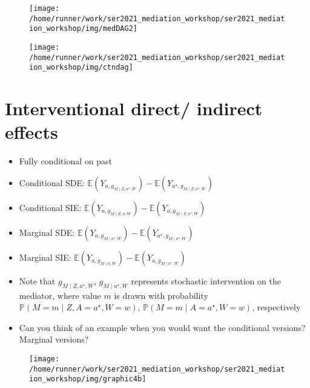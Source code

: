 \documentclass[
  12pt, krantz2,
]{book}
\providecommand{\tightlist}{%
  \setlength{\itemsep}{0pt}\setlength{\parskip}{0pt}}
\theoremstyle{definition}
\theoremstyle{definition}
\theoremstyle{definition}
\renewcommand{\P}{\mathbb{P}}
\newcommand{\E}{\mathbb{E}}
\newcommand{\1}{\mathbbm{1}}
\begin{document}
\begin{figure}

{\centering \texttt{[image: /home/runner/work/ser2021\_mediation\_workshop/ser2021\_mediation\_workshop/img/medDAG2]} 

}

\end{figure}

\begin{figure}

{\centering \texttt{[image: /home/runner/work/ser2021\_mediation\_workshop/ser2021\_mediation\_workshop/img/ctndag]} 

}

\end{figure}

\hypertarget{interventional-direct-indirect-effects}{%
\section*{Interventional direct/ indirect effects}\label{interventional-direct-indirect-effects}}


\begin{itemize}
\tightlist
\item
  Fully conditional on past
\item
  Conditional SDE: \(\E(Y_{a, g_{M \mid Z, a^{\star}, W}}) - \E(Y_{a^{\star}, g_{M \mid Z, a^{\star}, W}})\)
\item
  Conditional SIE: \(\E(Y_{a, g_{M \mid Z, a, W}}) - \E(Y_{a, g_{M \mid Z, a^{\star}, W}})\)
\item
  Marginal SDE: \(\E(Y_{a, g_{M \mid a^{\star}, W}}) - \E(Y_{a^{\star}, g_{M \mid a^{\star}, W}})\)
\item
  Marginal SIE: \(\E(Y_{a, g_{M \mid a, W}}) - \E(Y_{a, g_{M \mid a^{\star}, W}})\)
\item
  Note that \(g_{M \mid Z, a^{\star}, W}\), \(g_{M \mid a^{\star}, W}\) represents
  stochastic intervention on the mediator, where value \(m\) is drawn with
  probability \(\P(M = m \mid Z, A = a^{\star}, W = w)\),
  \(\P(M = m \mid A = a^{\star}, W = w)\), respectively
\item
  Can you think of an example when you would want the conditional versions?
  Marginal versions?
\end{itemize}

\begin{figure}

{\centering \texttt{[image: /home/runner/work/ser2021\_mediation\_workshop/ser2021\_mediation\_workshop/img/graphic4b]} 

}

\end{figure}
\end{document}
